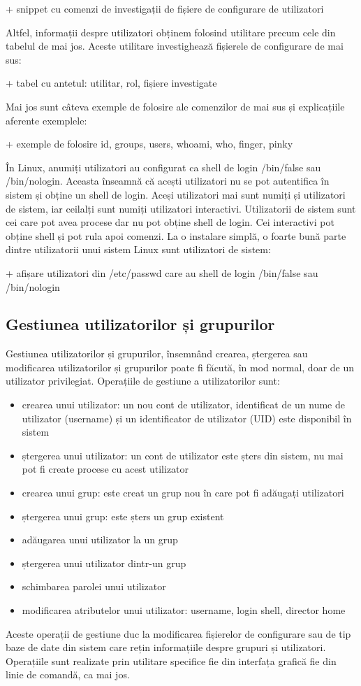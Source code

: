 + snippet cu comenzi de investigații de fișiere de configurare de utilizatori

Altfel, informații despre utilizatori obținem folosind utilitare precum cele din
tabelul de mai jos. Aceste utilitare investighează fișierele de configurare de
mai sus:

+ tabel cu antetul: utilitar, rol, fișiere investigate

Mai jos sunt câteva exemple de folosire ale comenzilor de mai sus și
explicațiile aferente exemplele:

+ exemple de folosire id, groups, users, whoami, who, finger, pinky

În Linux, anumiți utilizatori au configurat ca shell de login /bin/false sau
/bin/nologin. Aceasta înseamnă că acești utilizatori nu se pot autentifica în
sistem și obține un shell de login. Aceși utilizatori mai sunt numiți și
utilizatori de sistem, iar ceilalți sunt numiți utilizatori interactivi.
Utilizatorii de sistem sunt cei care pot avea procese dar nu pot obține shell de
login. Cei interactivi pot obține shell și pot rula apoi comenzi. La o instalare
simplă, o foarte bună parte dintre utilizatorii unui sistem Linux sunt
utilizatori de sistem:

+ afișare utilizatori din /etc/passwd care au shell de login /bin/false sau /bin/nologin

\subsection{Gestiunea utilizatorilor și grupurilor}
\label{sec:users-ops-groups}

Gestiunea utilizatorilor și grupurilor, însemnând crearea, ștergerea sau
modificarea utilizatorilor și grupurilor poate fi făcută, în mod normal, doar de
un utilizator privilegiat. Operațiile de gestiune a utilizatorilor sunt:

\begin{itemize}
	\item crearea unui utilizator: un nou cont de utilizator, identificat de
		un nume de utilizator (username) și un identificator de
		utilizator (UID) este disponibil în sistem
	\item ștergerea unui utilizator: un cont de utilizator este șters din
		sistem, nu mai pot fi create procese cu acest utilizator
	\item crearea unui grup: este creat un grup nou în care pot fi adăugați
		utilizatori
	\item ștergerea unui grup: este șters un grup existent
	\item adăugarea unui utilizator la un grup
	\item ștergerea unui utilizator dintr-un grup
	\item schimbarea parolei unui utilizator
	\item modificarea atributelor unui utilizator: username, login shell,
		director home
\end{itemize}
Aceste operații de gestiune duc la modificarea fișierelor de configurare sau de
tip baze de date din sistem care rețin informațiile despre grupuri și
utilizatori. Operațiile sunt realizate prin utilitare specifice fie din
interfața grafică fie din linie de comandă, ca mai jos.

